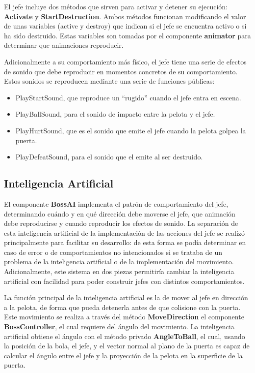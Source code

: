El jefe incluye dos métodos que sirven para activar y detener su ejecución: \textbf{Activate} y \textbf{StartDestruction}. Ambos métodos funcionan modificando el valor de unas variables (active y destroy) que indican si el jefe se encuentra activo o si ha sido destruido. Estas variables son tomadas por el componente \textbf{animator} para determinar que animaciones reproducir.

Adicionalmente a su comportamiento más físico, el jefe tiene una serie de efectos de sonido que debe reproducir en momentos concretos de su comportamiento. Estos sonidos se reproducen mediante una serie de funciones públicas:
\begin{itemize}
\item PlayStartSound, que reproduce un ``rugido'' cuando el jefe entra en escena.
\item PlayBallSound, para el sonido de impacto entre la pelota y el jefe.
\item PlayHurtSound, que es el sonido que emite el jefe cuando la pelota golpea la puerta.
\item PlayDefeatSound, para el sonido que el emite al ser destruido.
\end{itemize}

\subsection{Inteligencia Artificial}
El componente \textbf{BossAI} implementa el patrón de comportamiento del jefe, determinando cuándo y en qué dirección debe moverse el jefe, que animación debe reproducirse y cuando reproducir los efectos de sonido. La separación de esta inteligencia artificial de la implementación de las acciones del jefe se realizó principalmente para facilitar su desarrollo: de esta forma se podía determinar en caso de error o de comportamientos no intencionados si se trataba de un problema de la inteligencia artificial o de la implementación del movimiento. Adicionalmente, este sistema en dos piezas permitiría cambiar la inteligencia artificial con facilidad para poder construir jefes con distintos comportamientos.

La función principal de la inteligencia artificial es la de mover al jefe en dirección a la pelota, de forma que pueda detenerla antes de que colisione con la puerta. Este movimiento se realiza a través del método \textbf{MoveDirection} el componente \textbf{BossController}, el cual requiere del ángulo del movimiento. La inteligencia artificial obtiene el ángulo con el método privado \textbf{AngleToBall}, el cual, usando la posición de la bola, el jefe, y el vector normal al plano de la puerta es capaz de calcular el ángulo entre el jefe y la proyección de la pelota en la superficie de la puerta.


